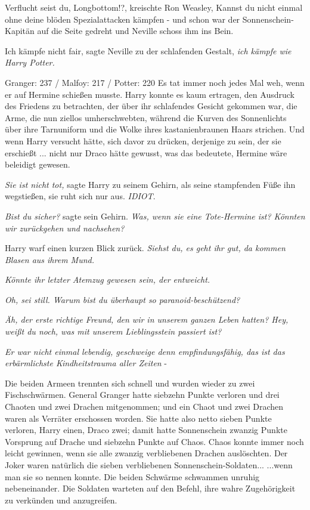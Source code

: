 \glqq{}Verflucht seist du, Longbottom!?\grqq{}, kreischte Ron Weasley, \glqq{}
Kannst du nicht einmal ohne deine blöden Spezialattacken kämpfen -\grqq{} und
schon war der Sonnenschein-Kapitän auf die Seite gedreht und Neville schoss ihm
ins Bein.

\glqq{}Ich kämpfe nicht fair\grqq{}, sagte Neville zu der schlafenden Gestalt,
\glqq{}\emph{ich kämpfe wie Harry Potter.}\grqq{}

Granger: 237 / Malfoy: 217 / Potter: 220 Es tat immer noch jedes Mal weh, wenn
er auf Hermine schießen musste. Harry konnte es kaum ertragen, den Ausdruck des
Friedens zu betrachten, der über ihr schlafendes Gesicht gekommen war, die Arme,
die nun ziellos umherschwebten, während die Kurven des Sonnenlichts über ihre
Tarnuniform und die Wolke ihres kastanienbraunen Haars strichen. Und wenn Harry
versucht hätte, sich davor zu drücken, derjenige zu sein, der sie erschießt ...
nicht nur Draco hätte gewusst, was das bedeutete, Hermine wäre beleidigt
gewesen.

\emph{Sie ist nicht tot,} sagte Harry zu seinem Gehirn, als seine stampfenden
Füße ihn wegstießen, sie ruht sich nur aus. \emph{IDIOT}.

\emph{Bist du sicher?} sagte sein Gehirn. \emph{Was, wenn sie eine Tote-Hermine
ist? Könnten wir zurückgehen und nachsehen?}

Harry warf einen kurzen Blick zurück.
\emph{Siehst du, es geht ihr gut, da kommen Blasen aus ihrem Mund.}

\emph{Könnte ihr letzter Atemzug gewesen sein, der entweicht.}

\emph{Oh, sei still. Warum bist du überhaupt so paranoid-beschützend?}

\emph{Äh, der erste richtige Freund, den wir in unserem ganzen Leben hatten?
Hey, weißt du noch, was mit unserem Lieblingsstein passiert ist?}

\emph{Er war nicht einmal lebendig, geschweige denn empfindungsfähig, das ist
das erbärmlichste Kindheitstrauma aller Zeiten} -

Die beiden Armeen trennten sich schnell und wurden wieder zu zwei
Fischschwärmen. General Granger hatte siebzehn Punkte verloren und drei Chaoten
und zwei Drachen mitgenommen; und ein Chaot und zwei Drachen waren als Verräter
erschossen worden. Sie hatte also netto sieben Punkte verloren, Harry einen,
Draco zwei; damit hatte Sonnenschein zwanzig Punkte Vorsprung auf Drache und
siebzehn Punkte auf Chaos. Chaos konnte immer noch leicht gewinnen, wenn sie
alle zwanzig verbliebenen Drachen auslöschten. Der Joker waren natürlich die
sieben verbliebenen Sonnenschein-Soldaten... ...wenn man sie so nennen konnte.
Die beiden Schwärme schwammen unruhig nebeneinander. Die Soldaten warteten auf
den Befehl, ihre wahre Zugehörigkeit zu verkünden und anzugreifen.

